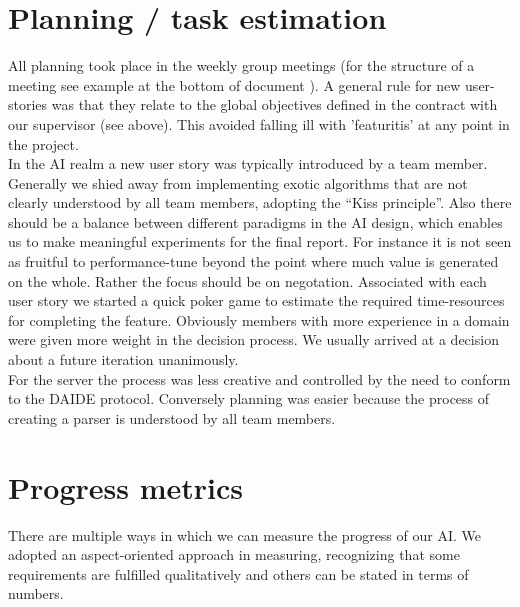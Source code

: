\documentclass[pdftex,12pt,a4paper]{report}
\begin{document}
\section{Planning / task estimation}
All planning took place in the weekly group meetings (for the
structure of a meeting see example at the bottom of document ). A
general rule for new user-stories was that they relate to the global
objectives defined in the contract with our supervisor (see
above). This avoided falling ill with 'featuritis' at any point in the
project.  \\ In the AI realm a new user story was typically introduced
by a team member. Generally we shied away from implementing exotic
algorithms that are not clearly understood by all team members,
adopting the ``Kiss principle''. Also there should be a balance
between different paradigms in the AI design, which enables us to make
meaningful experiments for the final report. For instance it is not
seen as fruitful to performance-tune beyond the point where much value
is generated on the whole. Rather the focus should be on
negotation. Associated with each user story we started a quick poker
game to estimate the required time-resources for completing the
feature. Obviously members with more experience in a domain were given
more weight in the decision process.  We usually arrived at a decision
about a future iteration unanimously.  \\ For the server the process
was less creative and controlled by the need to conform to the DAIDE
protocol. Conversely planning was easier because the process of
creating a parser is understood by all team members.

\section{Progress metrics}
There are multiple ways in which we can measure the progress of our
AI.  We adopted an aspect-oriented approach in measuring, recognizing
that some requirements are fulfilled qualitatively and others can be
stated in terms of numbers.
\end{document}
